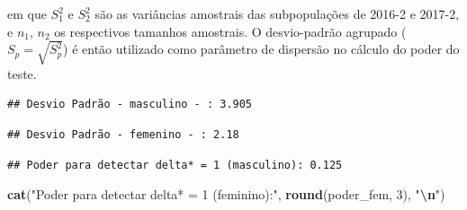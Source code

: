 \documentclass[
]{article}
\newenvironment{Shaded}{\begin{snugshade}}{\end{snugshade}}
\newcommand{\AttributeTok}[1]{\textcolor[rgb]{0.13,0.29,0.53}{#1}}
\newcommand{\CommentTok}[1]{\textcolor[rgb]{0.56,0.35,0.01}{\textit{#1}}}
\newcommand{\DecValTok}[1]{\textcolor[rgb]{0.00,0.00,0.81}{#1}}
\newcommand{\FloatTok}[1]{\textcolor[rgb]{0.00,0.00,0.81}{#1}}
\newcommand{\FunctionTok}[1]{\textcolor[rgb]{0.13,0.29,0.53}{\textbf{#1}}}
\newcommand{\NormalTok}[1]{#1}
\newcommand{\OtherTok}[1]{\textcolor[rgb]{0.56,0.35,0.01}{#1}}
\newcommand{\SpecialCharTok}[1]{\textcolor[rgb]{0.81,0.36,0.00}{\textbf{#1}}}
\newcommand{\StringTok}[1]{\textcolor[rgb]{0.31,0.60,0.02}{#1}}
\begin{document}
em que \(S_1^2\) e \(S_2^2\) são as variâncias amostrais das subpopulações de 2016-2 e 2017-2, e \(n_1\), \(n_2\) os respectivos tamanhos amostrais. O desvio-padrão agrupado (\(S_p = \sqrt{S_p^2}\)) é então utilizado como parâmetro de dispersão no cálculo do poder do teste.

\begin{verbatim}
## Desvio Padrão - masculino - : 3.905
\end{verbatim}

\begin{verbatim}
## Desvio Padrão - femenino - : 2.18
\end{verbatim}

\begin{Shaded}
\end{Shaded}

\begin{verbatim}
## Poder para detectar delta* = 1 (masculino): 0.125
\end{verbatim}

\begin{Shaded}
\begin{Highlighting}[]
\FunctionTok{cat}\NormalTok{(}\StringTok{"Poder para detectar delta* = 1 (feminino):"}\NormalTok{, }\FunctionTok{round}\NormalTok{(poder\_fem, }\DecValTok{3}\NormalTok{), }\StringTok{"}\SpecialCharTok{\textbackslash{}n}\StringTok{"}\NormalTok{)}
\end{Highlighting}
\end{Shaded}
\end{document}
